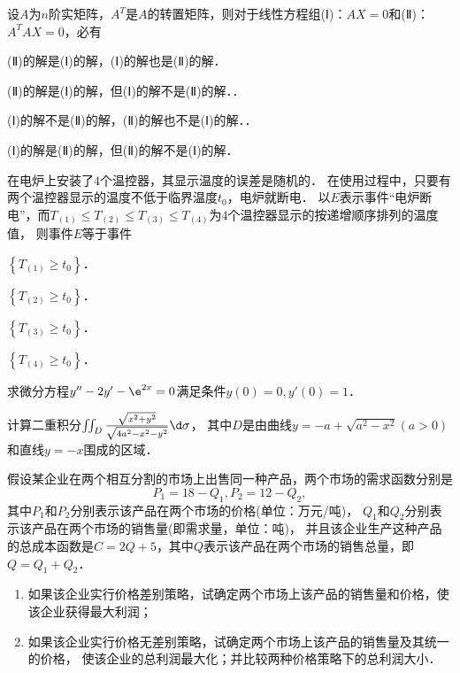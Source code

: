\documentclass[plain,noanswer,medmath]{../../template/jnuexam}
\begin{document}
\begin{problem}
设$A$为$n$阶实矩阵，$A^T$是$A$的转置矩阵，则对于线性方程组(Ⅰ)：$AX = 0$和(Ⅱ)：$A^T AX = 0$，必有\pickout{}
\begin{abcd}
\item (Ⅱ)的解是(Ⅰ)的解，(Ⅰ)的解也是(Ⅱ)的解．
\item (Ⅱ)的解是(Ⅰ)的解，但(Ⅰ)的解不是(Ⅱ)的解．．
\item (Ⅰ)的解不是(Ⅱ)的解，(Ⅱ)的解也不是(Ⅰ)的解．．
\item (Ⅰ)的解是(Ⅱ)的解，但(Ⅱ)的解不是(Ⅰ)的解．
\end{abcd}
\end{problem}


\begin{problem}
在电炉上安装了$4$个温控器，其显示温度的误差是随机的．
在使用过程中，只要有两个温控器显示的温度不低于临界温度$t_0$，电炉就断电．
以$E$表示事件“电炉断电”，而$T_{(1)} \le T_{(2)} \le T_{(3)} \le T_{(4)}$为$4$个温控器显示的按递增顺序排列的温度值，
则事件$E$等于事件\pickout{}
\begin{abcd}
\item $\left\{T_{(1)} \ge t_0 \right\}$．
\item $\left\{T_{(2)} \ge t_0 \right\}$．
\item $\left\{T_{(3)} \ge t_0 \right\}$．
\item $\left\{T_{(4)} \ge t_0 \right\}$．
\end{abcd}
\end{problem}



\begin{problem}
求微分方程$y'' - 2y' - \e^{2x} = 0$满足条件$y(0) = 0,y'(0) = 1$．
\end{problem}



\begin{problem}
计算二重积分$\iint_D \frac{\sqrt{x^2 + y^2}}{\sqrt{4a^2 - x^2 - y^2}}\d\sigma$，
其中$D$是由曲线$y = - a + \sqrt{a^2 - x^2} (a > 0)$ 和直线$y = - x$围成的区域．
\end{problem}



\begin{problem}
假设某企业在两个相互分割的市场上出售同一种产品，两个市场的需求函数分别是
$$P_1 = 18 - Q_1,P_2 = 12 - Q_2,$$
其中$P_1$和$P_2$分别表示该产品在两个市场的价格(单位：万元/吨)，
$Q_1$和$Q_2$分别表示该产品在两个市场的销售量(即需求量，单位：吨)，
并且该企业生产这种产品的总成本函数是$C = 2Q + 5$，其中$Q$表示该产品在两个市场的销售总量，即$Q = Q_1 + Q_2$．
\begin{enumerate}
\item 如果该企业实行价格差别策略，试确定两个市场上该产品的销售量和价格，使该企业获得最大利润；
\item 如果该企业实行价格无差别策略，试确定两个市场上该产品的销售量及其统一的价格，
      使该企业的总利润最大化；并比较两种价格策略下的总利润大小．
\end{enumerate}

\end{problem}
\end{document}
